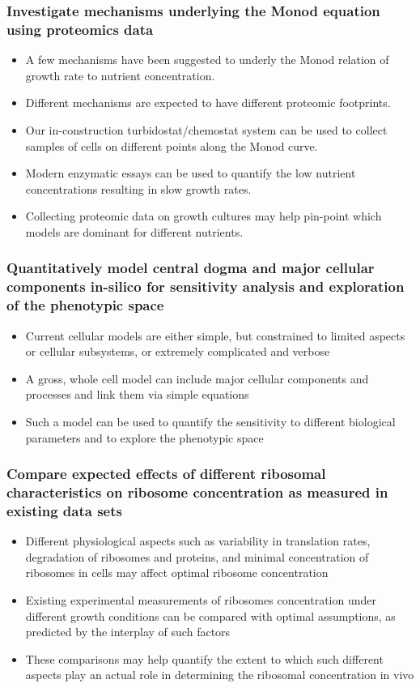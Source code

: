 \documentclass{beamer}
\begin{document}
\begin{frame}
\frametitle{Investigate mechanisms underlying the Monod equation using proteomics data}
\begin{itemize}
\item A few mechanisms have been suggested to underly the Monod relation of growth rate to nutrient concentration.
\item Different mechanisms are expected to have different proteomic footprints.
\item Our in-construction turbidostat/chemostat system can be used to collect samples of cells on different points along the Monod curve.
\item Modern enzymatic essays can be used to quantify the low nutrient concentrations resulting in slow growth rates.
\item Collecting proteomic data on growth cultures may help pin-point which models are dominant for different nutrients.
\end{itemize}
\end{frame}
\begin{frame}
\frametitle{Quantitatively model central dogma and major cellular components in-silico for sensitivity analysis and exploration of the phenotypic space}
\begin{itemize}
\item Current cellular models are either simple, but constrained to limited aspects or cellular subsystems, or extremely complicated and verbose
\item A gross, whole cell model can include major cellular components and processes and link them via simple equations
\item Such a model can be used to quantify the sensitivity to different biological parameters and to explore the phenotypic space
\end{itemize}
\end{frame}
\begin{frame}
\frametitle{Compare expected effects of different ribosomal characteristics on ribosome concentration as measured in existing data sets}
\begin{itemize}
\item Different physiological aspects such as variability in translation rates, degradation of ribosomes and proteins, and minimal concentration of ribosomes in cells may affect optimal ribosome concentration
\item Existing experimental measurements of ribosomes concentration under different growth conditions can be compared with optimal assumptions, as predicted by the interplay of such factors
\item These comparisons may help quantify the extent to which such different aspects play an actual role in determining the ribosomal concentration in vivo 
\end{itemize}
\end{frame}
\end{document}
